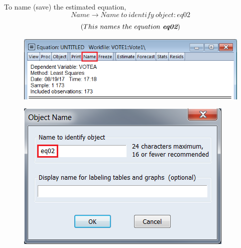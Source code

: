 \documentclass[12pt]{report}
\begin{document}
\noindent To name (save) the estimated equation,
$$Name \to Name\ to\ identify\ object: eq02$$
$$(This\ names\ the\ equation\ \textit{\textbf{eq02}})$$
\begin{figure}[H]
	\centering
	\includegraphics{q1_17}
\end{figure}
\vspace{-\baselineskip}
\begin{figure}[H]
	\centering
	\includegraphics{q1_18}
\end{figure}
\vspace{-\baselineskip}
\end{document}
